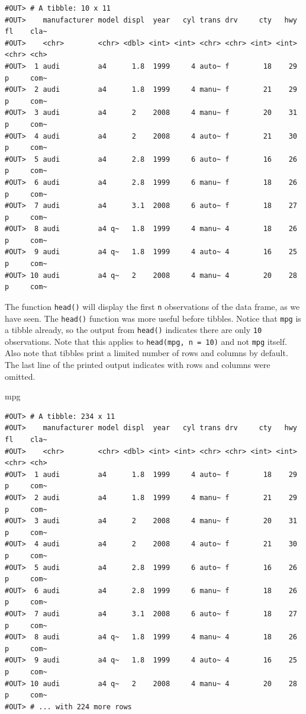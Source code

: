 \documentclass[]{book}
\newenvironment{Shaded}{\begin{snugshade}}{\end{snugshade}}
\newcommand{\NormalTok}[1]{#1}
\theoremstyle{definition}
\theoremstyle{definition}
\theoremstyle{definition}
\theoremstyle{remark}
\begin{document}
\begin{verbatim}
#OUT> # A tibble: 10 x 11
#OUT>    manufacturer model displ  year   cyl trans drv     cty   hwy fl    cla~
#OUT>    <chr>        <chr> <dbl> <int> <int> <chr> <chr> <int> <int> <chr> <ch>
#OUT>  1 audi         a4      1.8  1999     4 auto~ f        18    29 p     com~
#OUT>  2 audi         a4      1.8  1999     4 manu~ f        21    29 p     com~
#OUT>  3 audi         a4      2    2008     4 manu~ f        20    31 p     com~
#OUT>  4 audi         a4      2    2008     4 auto~ f        21    30 p     com~
#OUT>  5 audi         a4      2.8  1999     6 auto~ f        16    26 p     com~
#OUT>  6 audi         a4      2.8  1999     6 manu~ f        18    26 p     com~
#OUT>  7 audi         a4      3.1  2008     6 auto~ f        18    27 p     com~
#OUT>  8 audi         a4 q~   1.8  1999     4 manu~ 4        18    26 p     com~
#OUT>  9 audi         a4 q~   1.8  1999     4 auto~ 4        16    25 p     com~
#OUT> 10 audi         a4 q~   2    2008     4 manu~ 4        20    28 p     com~
\end{verbatim}

The function \texttt{head()} will display the first \texttt{n}
observations of the data frame, as we have seen. The \texttt{head()}
function was more useful before tibbles. Notice that \texttt{mpg} is a
tibble already, so the output from \texttt{head()} indicates there are
only \texttt{10} observations. Note that this applies to
\texttt{head(mpg,\ n\ =\ 10)} and not \texttt{mpg} itself. Also note
that tibbles print a limited number of rows and columns by default. The
last line of the printed output indicates with rows and columns were
omitted.

\begin{Shaded}
\begin{Highlighting}[]
\NormalTok{mpg}
\end{Highlighting}
\end{Shaded}

\begin{verbatim}
#OUT> # A tibble: 234 x 11
#OUT>    manufacturer model displ  year   cyl trans drv     cty   hwy fl    cla~
#OUT>    <chr>        <chr> <dbl> <int> <int> <chr> <chr> <int> <int> <chr> <ch>
#OUT>  1 audi         a4      1.8  1999     4 auto~ f        18    29 p     com~
#OUT>  2 audi         a4      1.8  1999     4 manu~ f        21    29 p     com~
#OUT>  3 audi         a4      2    2008     4 manu~ f        20    31 p     com~
#OUT>  4 audi         a4      2    2008     4 auto~ f        21    30 p     com~
#OUT>  5 audi         a4      2.8  1999     6 auto~ f        16    26 p     com~
#OUT>  6 audi         a4      2.8  1999     6 manu~ f        18    26 p     com~
#OUT>  7 audi         a4      3.1  2008     6 auto~ f        18    27 p     com~
#OUT>  8 audi         a4 q~   1.8  1999     4 manu~ 4        18    26 p     com~
#OUT>  9 audi         a4 q~   1.8  1999     4 auto~ 4        16    25 p     com~
#OUT> 10 audi         a4 q~   2    2008     4 manu~ 4        20    28 p     com~
#OUT> # ... with 224 more rows
\end{verbatim}
\end{document}
